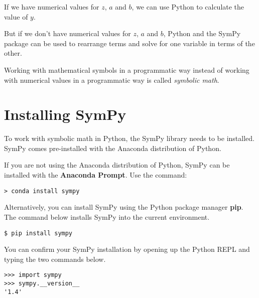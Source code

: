 \documentclass{book}
\begin{document}
    
        If we have numerical values for \(z\), \(a\) and \(b\), we can use
Python to calculate the value of \(y\).

But if we don't have numerical values for \(z\), \(a\) and \(b\), Python
and the SymPy package can be used to rearrange terms and solve for one
variable in terms of the other.

Working with mathematical symbols in a programmatic way instead of
working with numerical values in a programmatic way is called
\emph{symbolic math}.
    




    
        \hypertarget{installing-sympy}{%
\section{Installing SymPy}\label{installing-sympy}}
    




    
        To work with symbolic math in Python, the SymPy library needs to be
installed. SymPy comes pre-installed with the Anaconda distribution of
Python.
    




    
        If you are not using the Anaconda distribution of Python, SymPy can be
installed with the \textbf{Anaconda Prompt}. Use the command:

\begin{lstlisting}
> conda install sympy
\end{lstlisting}
    




    
        Alternatively, you can install SymPy using the Python package manager
\textbf{pip}. The command below installs SymPy into the current
environment.

\begin{lstlisting}
$ pip install sympy
\end{lstlisting}
    




    
        You can confirm your SymPy installation by opening up the Python REPL
and typing the two commands below.
    




    
        \begin{lstlisting}
>>> import sympy
>>> sympy.__version__
'1.4'
\end{lstlisting}
    
\end{document}
